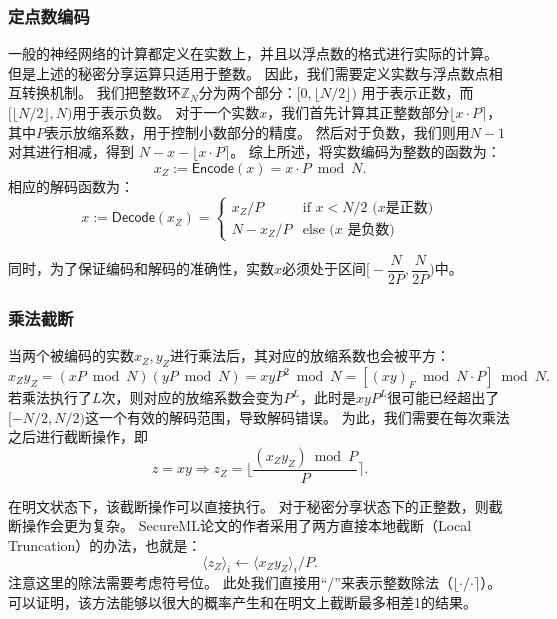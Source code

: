 \subsubsection{定点数编码}
一般的神经网络的计算都定义在实数上，并且以浮点数的格式进行实际的计算。
%
但是上述的秘密分享运算只适用于整数。
%
因此，我们需要定义实数与浮点数点相互转换机制。
%
我们把整数环$\mathbb Z_N$分为两个部分：$[0, \lfloor N/2 \rfloor)$ 用于表示正数，而$[\lfloor N/2 \rfloor, N)$用于表示负数。
%
对于一个实数$x$，我们首先计算其正整数部分$\lfloor x\cdot P \rceil$，其中$P$表示放缩系数，用于控制小数部分的精度。
%
然后对于负数，我们则用$N - 1$对其进行相减，得到 $N - x - \lfloor x\cdot P \rceil$。
%
综上所述，将实数编码为整数的函数为：
\begin{equation}
    x_Z := \mathsf{Encode}(x) = x \cdot P \bmod N.
\end{equation}
%
相应的解码函数为：
\begin{equation}
    x := \mathsf{Decode}(x_Z) = \begin{cases}
        x_Z / P         & \text{if $x < N/2$ ($x$是正数)} \\
        N - x_Z / P     & \text{else ($x$ 是负数)}
    \end{cases}
\end{equation}
%

同时，为了保证编码和解码的准确性，实数$x$必须处于区间$\big[ -\dfrac{N}{2P}, \dfrac{N}{2P} \big)$中。


\subsubsection{乘法截断}
当两个被编码的实数$x_Z, y_Z$进行乘法后，其对应的放缩系数也会被平方：
\begin{equation}
    x_Zy_Z = (xP \bmod N)(yP \bmod N) = xyP^2 \bmod N = [(xy)_F \bmod N \cdot P] \bmod N.
\end{equation}
%
若乘法执行了$L$次，则对应的放缩系数会变为$P^L$，此时是$xyP^L$很可能已经超出了$[-N/2, N/2)$这一个有效的解码范围，导致解码错误。
%
为此，我们需要在每次乘法之后进行截断操作，即
\begin{equation}
    z = xy \Rightarrow z_Z = \Big\lfloor \dfrac{(x_Z y_Z) \bmod P}{P} \Big\rceil.
\end{equation}
%

在明文状态下，该截断操作可以直接执行。
%
对于秘密分享状态下的正整数，则截断操作会更为复杂。
%
SecureML论文的作者采用了两方直接本地截断（Local Truncation）的办法，也就是：
\begin{equation}
    \langle z_Z \rangle_i \gets \langle x_Zy_Z \rangle_i / P.
\end{equation}
%
注意这里的除法需要考虑符号位。
此处我们直接用“/”来表示整数除法（$\lfloor \cdot / \cdot \rceil$）。
%
可以证明，该方法能够以很大的概率产生和在明文上截断最多相差1的结果。

